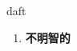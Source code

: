 
\begin{frame}
{\huge daft}
\begin{center}
\begin{enumerate}\Large
  \item \textbf{不明智的}
\end{enumerate}
\end{center}
\end{frame}
